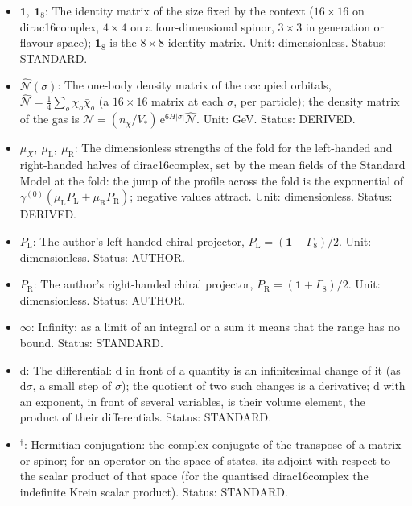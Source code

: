 \documentclass[
  10pt,
]{article}
\begin{document}
\begin{itemize}
  Unit: GeV. Status: DERIVED.
\item
  \(\mathbf{1},\ \mathbf{1}_8\): The identity matrix of the size fixed
  by the context (\(16 \times 16\) on dirac16complex, \(4 \times 4\) on
  a four-dimensional spinor, \(3 \times 3\) in generation or flavour
  space); \(\mathbf{1}_8\) is the \(8 \times 8\) identity matrix. Unit:
  dimensionless. Status: STANDARD.
\item
  \(\hat{\mathcal{N}}(\sigma)\): The one-body density matrix of the
  occupied orbitals,
  \(\hat{\mathcal{N}} = \frac14\sum_o\chi_o\bar\chi_o\) (a
  \(16 \times 16\) matrix at each \(\sigma\), per particle); the density
  matrix of the gas is
  \(\mathcal{N} = (n_\chi/V_*)\,\mathrm{e}^{6H\lvert\sigma\rvert}\hat{\mathcal{N}}\).
  Unit: GeV. Status: DERIVED.
\item
  \(\mu_X,\ \mu_{\mathrm{L}},\ \mu_{\mathrm{R}}\): The dimensionless
  strengths of the fold for the left-handed and right-handed halves of
  dirac16complex, set by the mean fields of the Standard Model at the
  fold: the jump of the profile across the fold is the exponential of
  \(\gamma^{(0)}(\mu_{\mathrm{L}}P_{\mathrm{L}} + \mu_{\mathrm{R}}P_{\mathrm{R}})\);
  negative values attract. Unit: dimensionless. Status: DERIVED.
\item
  \(P_{\mathrm{L}}\): The author's left-handed chiral projector,
  \(P_{\mathrm{L}} = (\mathbf{1} - \Gamma_8)/2\). Unit: dimensionless.
  Status: AUTHOR.
\item
  \(P_{\mathrm{R}}\): The author's right-handed chiral projector,
  \(P_{\mathrm{R}} = (\mathbf{1} + \Gamma_8)/2\). Unit: dimensionless.
  Status: AUTHOR.
\item
  \(\infty\): Infinity: as a limit of an integral or a sum it means that
  the range has no bound. Status: STANDARD.
\item
  \(\mathrm{d}\): The differential: \(\mathrm{d}\) in front of a
  quantity is an infinitesimal change of it (as \(\mathrm{d}\sigma\), a
  small step of \(\sigma\)); the quotient of two such changes is a
  derivative; \(\mathrm{d}\) with an exponent, in front of several
  variables, is their volume element, the product of their
  differentials. Status: STANDARD.
\item
  \({}^\dagger\): Hermitian conjugation: the complex conjugate of the
  transpose of a matrix or spinor; for an operator on the space of
  states, its adjoint with respect to the scalar product of that space
  (for the quantised dirac16complex the indefinite Krein scalar
  product). Status: STANDARD.

\end{itemize}
\end{document}

